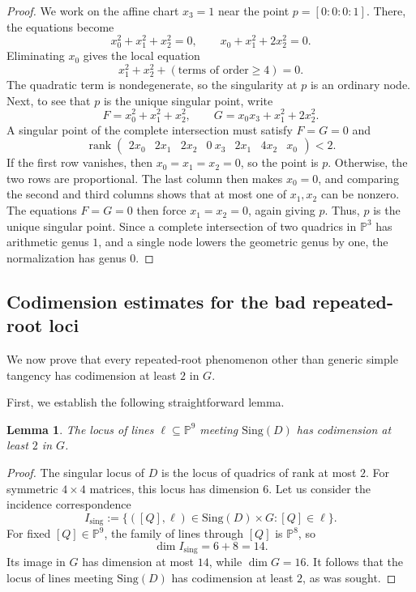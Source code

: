 \documentclass[11pt]{article}
\newtheorem{lemma}[theorem]{Lemma}
\newcommand{\Pj}{\mathbb P}
\newcommand{\Sing}{\mathrm{Sing}}
\begin{document}
\begin{proof}
We work on the affine chart $x_3=1$ near the point $p=[0:0:0:1]$. There, the equations become
\[
 x_0^2+x_1^2+x_2^2=0,
 \qquad
 x_0+x_1^2+2x_2^2=0.
\]
Eliminating $x_0$ gives the local equation
\[
 x_1^2+x_2^2 + (\text{terms of order}\ge 4) =0.
\]
The quadratic term is nondegenerate, so the singularity at $p$ is an ordinary node. Next, to see that $p$ is the unique singular point, write
\[
F=x_0^2+x_1^2+x_2^2,
\qquad
G=x_0x_3+x_1^2+2x_2^2.
\]
A singular point of the complete intersection must satisfy $F=G=0$ and
\[
\operatorname{rank}
\begin{pmatrix}
2x_0 & 2x_1 & 2x_2 & 0\
x_3 & 2x_1 & 4x_2 & x_0
\end{pmatrix}<2.
\]
If the first row vanishes, then $x_0=x_1=x_2=0$, so the point is $p$. Otherwise, the two rows are proportional. The last column then makes $x_0=0$, and comparing the second and third columns shows that at most one of $x_1,x_2$ can be nonzero. The equations $F=G=0$ then force $x_1=x_2=0$, again giving $p$. Thus, $p$ is the unique singular point. Since a complete intersection of two quadrics in $\Pj^3$ has arithmetic genus $1$, and a single node lowers the geometric genus by one, the normalization has genus $0$.
\end{proof}

\subsection{Codimension estimates for the bad repeated-root loci}

We now prove that every repeated-root phenomenon other than generic simple tangency has codimension at least $2$ in $G$.

First, we establish the following straightforward lemma.

\begin{lemma}\label{lem:lines-meeting-singD}
The locus of lines $\ell\subseteq \Pj^9$ meeting $\Sing(D)$ has codimension at least $2$ in $G$.
\end{lemma}

\begin{proof}
The singular locus of $D$ is the locus of quadrics of rank at most $2$. For symmetric $4\times 4$ matrices, this locus has dimension $6$. Let us consider the incidence correspondence
\[
I_{\mathrm{sing}}:=\{([Q],\ell)\in \Sing(D)\times G:[Q]\in \ell\}.
\] 
For fixed $[Q]\in \Pj^9$, the family of lines through $[Q]$ is $\Pj^8$, so
\[
\dim I_{\mathrm{sing}} = 6+8 = 14.
\]
Its image in $G$ has dimension at most $14$, while $\dim G=16$. It follows that the locus of lines meeting $\Sing(D)$ has codimension at least $2$, as was sought.
\end{proof}
\end{document}
